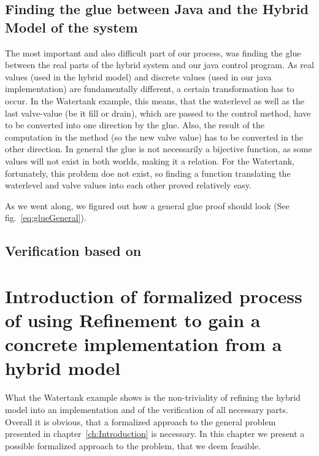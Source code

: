 \section{Finding the glue between Java and the Hybrid Model of the system}
\label{sec:Watertank:Glue}

The most important and also difficult part of our process, was finding the glue between the real parts of the hybrid system and our java control program. As real values (used in the hybrid model) and discrete values (used in our java implementation) are fundamentally different, a certain transformation has to occur.  In the Watertank example, this means, that the waterlevel as well as the last valve-value (be it fill or drain), which are passed to the control method, have to be converted into one direction by the glue. Also, the result of the computation in the method (so the new valve value) has to be converted in the other direction. In general the glue is not necessarily a bijective function, as some values will not exist in both worlds, making it a relation. For the Watertank, fortunately, this problem doe not exist, so finding a function translating the waterlevel and valve values into each other proved relatively easy. 

As we went along, we figured out how a general glue proof should look (See fig.~\ref{eq:glueGeneral}).

\section{Verification based on \keym}
\label{sec:Watertank:Verification}

\chapter{Introduction of formalized process of using Refinement to gain a concrete implementation from a hybrid model}
\label{ch:Process}

What the Watertank example shows is the non-triviality of refining the hybrid model into an implementation and of the verification of all necessary parts. Overall it is obvious, that a formalized approach to the general problem presented in chapter~\ref{ch:Introduction} is necessary. In this chapter we present a possible formalized approach to the problem, that we deem feasible.
\\

